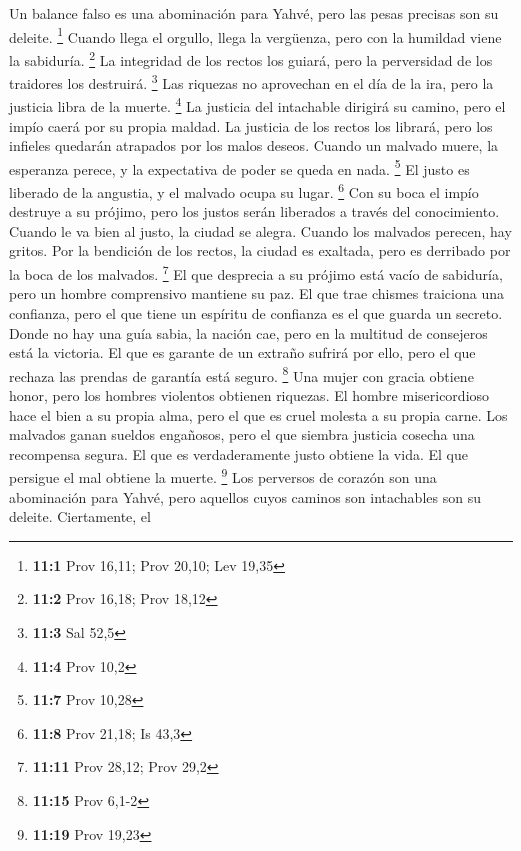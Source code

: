 \begin{paracol}{2}
 Un balance falso es una abominación para Yahvé, pero las
pesas precisas son su deleite. \footnote{\textbf{11:1} Prov 16,11; Prov
  20,10; Lev 19,35}  Cuando llega el orgullo, llega la
vergüenza, pero con la humildad viene la sabiduría. \footnote{\textbf{11:2}
  Prov 16,18; Prov 18,12}  La integridad de los rectos los
guiará, pero la perversidad de los traidores los destruirá. \footnote{\textbf{11:3}
  Sal 52,5}  Las riquezas no aprovechan en el día de la
ira, pero la justicia libra de la muerte. \footnote{\textbf{11:4} Prov
  10,2}  La justicia del intachable dirigirá su camino,
pero el impío caerá por su propia maldad.  La justicia de
los rectos los librará, pero los infieles quedarán atrapados por los
malos deseos.  Cuando un malvado muere, la esperanza
perece, y la expectativa de poder se queda en nada. \footnote{\textbf{11:7}
  Prov 10,28}  El justo es liberado de la angustia, y el
malvado ocupa su lugar. \footnote{\textbf{11:8} Prov 21,18; Is 43,3}
 Con su boca el impío destruye a su prójimo, pero los
justos serán liberados a través del conocimiento.  Cuando
le va bien al justo, la ciudad se alegra. Cuando los malvados perecen,
hay gritos.  Por la bendición de los rectos, la ciudad es
exaltada, pero es derribado por la boca de los malvados. \footnote{\textbf{11:11}
  Prov 28,12; Prov 29,2}  El que desprecia a su prójimo
está vacío de sabiduría, pero un hombre comprensivo mantiene su paz.
 El que trae chismes traiciona una confianza, pero el que
tiene un espíritu de confianza es el que guarda un secreto.
 Donde no hay una guía sabia, la nación cae, pero en la
multitud de consejeros está la victoria.  El que es
garante de un extraño sufrirá por ello, pero el que rechaza las prendas
de garantía está seguro. \footnote{\textbf{11:15} Prov 6,1-2}
 Una mujer con gracia obtiene honor, pero los hombres
violentos obtienen riquezas.  El hombre misericordioso
hace el bien a su propia alma, pero el que es cruel molesta a su propia
carne.  Los malvados ganan sueldos engañosos, pero el que
siembra justicia cosecha una recompensa segura.  El que
es verdaderamente justo obtiene la vida. El que persigue el mal obtiene
la muerte. \footnote{\textbf{11:19} Prov 19,23}  Los
perversos de corazón son una abominación para Yahvé, pero aquellos cuyos
caminos son intachables son su deleite.  Ciertamente, el

\end{paracol}
